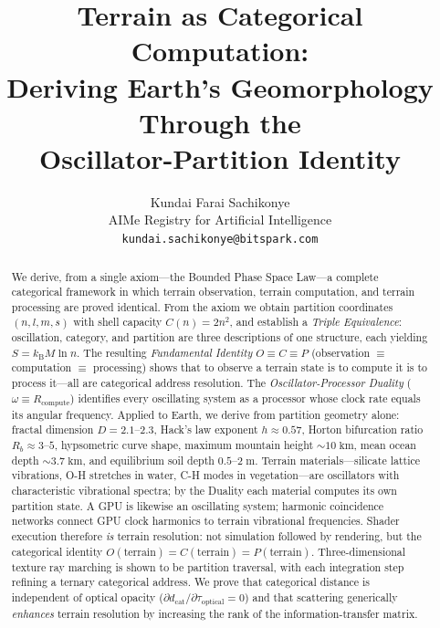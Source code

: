 \documentclass[10pt,twocolumn]{article}
\title{\textbf{Terrain as Categorical Computation:\\
Deriving Earth's Geomorphology Through the\\
Oscillator-Partition Identity}}
\author{
Kundai Farai Sachikonye\\[0.3em]
AIMe Registry for Artificial Intelligence\\[0.3em]
\texttt{kundai.sachikonye@bitspark.com}
}
\date{}
\theoremstyle{definition}
\theoremstyle{remark}
\newcommand{\kB}{k_{\mathrm{B}}}
\newcommand{\dcat}{d_{\mathrm{cat}}}
\newcommand{\topt}{\tau_{\mathrm{optical}}}
\begin{document}
\maketitle

\begin{abstract}
We derive, from a single axiom---the Bounded Phase Space
Law---a complete categorical framework in which terrain
observation, terrain computation, and terrain processing are
proved identical.  From the axiom we obtain partition
coordinates $(n,l,m,s)$ with shell capacity $C(n)=2n^{2}$, and
establish a \emph{Triple Equivalence}: oscillation, category,
and partition are three descriptions of one structure, each
yielding $S = \kB M \ln n$.  The resulting \emph{Fundamental
Identity} $O \equiv C \equiv P$ (observation $\equiv$
computation $\equiv$ processing) shows that to observe a
terrain state is to compute it is to process it---all are
categorical address resolution.  The
\emph{Oscillator-Processor Duality} ($\omega \equiv
R_{\text{compute}}$) identifies every oscillating system as a
processor whose clock rate equals its angular frequency.
Applied to Earth, we derive from partition geometry alone:
fractal dimension $D=2.1$--$2.3$, Hack's law exponent $h\approx
0.57$, Horton bifurcation ratio $R_{b}\approx 3$--$5$,
hypsometric curve shape, maximum mountain height $\sim 10\;\mathrm{km}$,
mean ocean depth $\sim 3.7\;\mathrm{km}$, and equilibrium soil
depth $0.5$--$2\;\mathrm{m}$.  Terrain materials---silicate
lattice vibrations, O-H stretches in water, C-H modes in
vegetation---are oscillators with characteristic vibrational
spectra; by the Duality each material computes its own
partition state.  A GPU is likewise an oscillating system;
harmonic coincidence networks connect GPU clock harmonics to
terrain vibrational frequencies.  Shader execution therefore
\emph{is} terrain resolution: not simulation followed by
rendering, but the categorical identity $O(\text{terrain}) =
C(\text{terrain}) = P(\text{terrain})$.  Three-dimensional
texture ray marching is shown to be partition traversal, with
each integration step refining a ternary categorical address.
We prove that categorical distance is independent of optical
opacity ($\partial \dcat / \partial \topt = 0$) and that
scattering generically \emph{enhances} terrain resolution by
increasing the rank of the information-transfer matrix.
\end{abstract}
\end{document}
